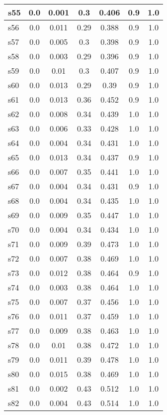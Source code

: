 \documentclass{article}
\begin{document}
\begin{tabular}{|l|c|c|c|c|c|c|}
\hline
s55 &0.0 & 0.001 & 0.3 & 0.406 & 0.9 & 1.0\\
\hline
s56 &0.0 & 0.011 & 0.29 & 0.388 & 0.9 & 1.0\\
\hline
s57 &0.0 & 0.005 & 0.3 & 0.398 & 0.9 & 1.0\\
\hline
s58 &0.0 & 0.003 & 0.29 & 0.396 & 0.9 & 1.0\\
\hline
s59 &0.0 & 0.01 & 0.3 & 0.407 & 0.9 & 1.0\\
\hline
s60 &0.0 & 0.013 & 0.29 & 0.39 & 0.9 & 1.0\\
\hline
s61 &0.0 & 0.013 & 0.36 & 0.452 & 0.9 & 1.0\\
\hline
s62 &0.0 & 0.008 & 0.34 & 0.439 & 1.0 & 1.0\\
\hline
s63 &0.0 & 0.006 & 0.33 & 0.428 & 1.0 & 1.0\\
\hline
s64 &0.0 & 0.004 & 0.34 & 0.431 & 1.0 & 1.0\\
\hline
s65 &0.0 & 0.013 & 0.34 & 0.437 & 0.9 & 1.0\\
\hline
s66 &0.0 & 0.007 & 0.35 & 0.441 & 1.0 & 1.0\\
\hline
s67 &0.0 & 0.004 & 0.34 & 0.431 & 0.9 & 1.0\\
\hline
s68 &0.0 & 0.004 & 0.34 & 0.435 & 1.0 & 1.0\\
\hline
s69 &0.0 & 0.009 & 0.35 & 0.447 & 1.0 & 1.0\\
\hline
s70 &0.0 & 0.004 & 0.34 & 0.434 & 1.0 & 1.0\\
\hline
s71 &0.0 & 0.009 & 0.39 & 0.473 & 1.0 & 1.0\\
\hline
s72 &0.0 & 0.007 & 0.38 & 0.469 & 1.0 & 1.0\\
\hline
s73 &0.0 & 0.012 & 0.38 & 0.464 & 0.9 & 1.0\\
\hline
s74 &0.0 & 0.003 & 0.38 & 0.464 & 1.0 & 1.0\\
\hline
s75 &0.0 & 0.007 & 0.37 & 0.456 & 1.0 & 1.0\\
\hline
s76 &0.0 & 0.011 & 0.37 & 0.459 & 1.0 & 1.0\\
\hline
s77 &0.0 & 0.009 & 0.38 & 0.463 & 1.0 & 1.0\\
\hline
s78 &0.0 & 0.01 & 0.38 & 0.472 & 1.0 & 1.0\\
\hline
s79 &0.0 & 0.011 & 0.39 & 0.478 & 1.0 & 1.0\\
\hline
s80 &0.0 & 0.015 & 0.38 & 0.469 & 1.0 & 1.0\\
\hline
s81 &0.0 & 0.002 & 0.43 & 0.512 & 1.0 & 1.0\\
\hline
s82 &0.0 & 0.004 & 0.43 & 0.514 & 1.0 & 1.0\\
\hline

\end{tabular}
\end{document}
